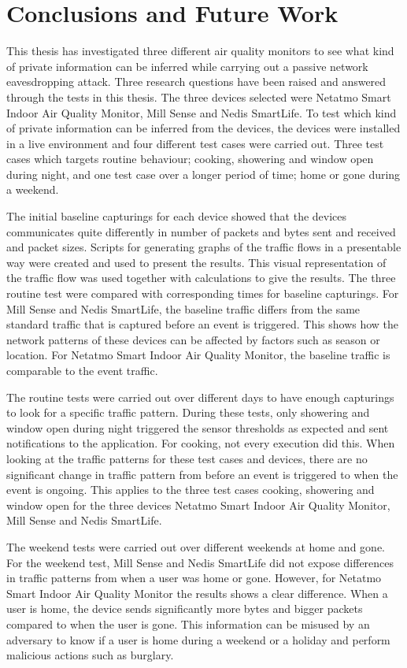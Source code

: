 \chapter{Conclusions and Future Work}
This thesis has investigated three different air quality monitors to see what kind of private information can be inferred while carrying out a passive network eavesdropping attack. Three research questions have been raised and answered through the tests in this thesis. The three devices selected were Netatmo Smart Indoor Air Quality Monitor, Mill Sense and Nedis SmartLife. To test which kind of private information can be inferred from the devices, the devices were installed in a live environment and four different test cases were carried out. Three test cases which targets routine behaviour; cooking, showering and window open during night, and one test case over a longer period of time; home or gone during a weekend. 

The initial baseline capturings for each device showed that the devices communicates quite differently in number of packets and bytes sent and received and packet sizes. Scripts for generating graphs of the traffic flows in a presentable way were created and used to present the results. This visual representation of the traffic flow was used together with calculations to give the results. The three routine test were compared with corresponding times for baseline capturings. For Mill Sense and Nedis SmartLife, the baseline traffic differs from the same standard traffic that is captured before an event is triggered. This shows how the network patterns of these devices can be affected by factors such as season or location. For Netatmo Smart Indoor Air Quality Monitor, the baseline traffic is comparable to the event traffic. 

The routine tests were carried out over different days to have enough capturings to look for a specific traffic pattern. During these tests, only showering and window open during night triggered the sensor thresholds as expected and sent notifications to the application. For cooking, not every execution did this. When looking at the traffic patterns for these test cases and devices, there are no significant change in traffic pattern from before an event is triggered to when the event is ongoing. This applies to the three test cases cooking, showering and window open for the three devices Netatmo Smart Indoor Air Quality Monitor, Mill Sense and Nedis SmartLife.  

The weekend tests were carried out over different weekends at home and gone. For the weekend test, Mill Sense and Nedis SmartLife did not expose differences in traffic patterns from when a user was home or gone. However, for Netatmo Smart Indoor Air Quality Monitor the results shows a clear difference. When a user is home, the device sends significantly more bytes and bigger packets compared to when the user is gone. This information can be misused by an adversary to know if a user is home during a weekend or a holiday and perform malicious actions such as burglary. 

